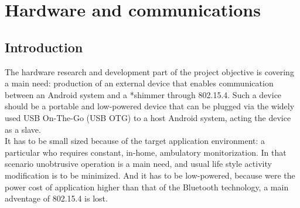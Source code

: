 \chapter{Hardware and communications}
\label{ch:hardware}
	\section{Introduction}	





	The hardware research and development part of the project objective is covering a main need: production of an external device that enables communication between an Android system and a *shimmer through 802.15.4. Such a device should be a portable and low-powered device that can be plugged via the widely used USB On-The-Go (USB OTG) to a host Android system, acting the device as a slave.\\

	It has to be small sized because of the target application environment: a particular who requires constant, in-home, ambulatory monitorization. 
	In that scenario unobtrusive operation is a main need, and usual life style activity modification is to be minimized. And it has to be low-powered, because were the power cost of application higher than that of the Bluetooth technology, a main adventage of 802.15.4 is lost.\\ 

